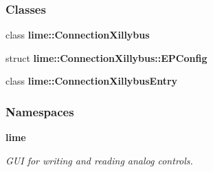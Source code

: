 \subsubsection*{Classes}
\begin{DoxyCompactItemize}
\item 
class {\bf lime\+::\+Connection\+Xillybus}
\item 
struct {\bf lime\+::\+Connection\+Xillybus\+::\+E\+P\+Config}
\item 
class {\bf lime\+::\+Connection\+Xillybus\+Entry}
\end{DoxyCompactItemize}
\subsubsection*{Namespaces}
\begin{DoxyCompactItemize}
\item 
 {\bf lime}
\begin{DoxyCompactList}\small\item\em G\+UI for writing and reading analog controls. \end{DoxyCompactList}\end{DoxyCompactItemize}
